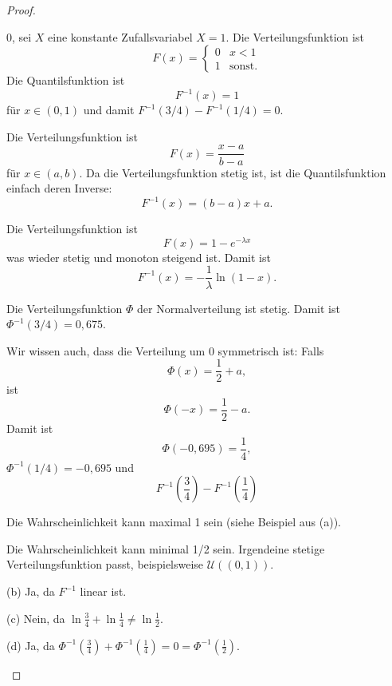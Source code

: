 	\begin{proof}
		\begin{parts}
			\item $0$, sei $X$ eine konstante Zufallsvariabel $X=1$. Die Verteilungsfunktion ist
			\[F(x)= \begin{cases}
				0 & x < 1\\
				1 & \text{sonst.}
			\end{cases}\]
			Die Quantilsfunktion ist
			\[F^{-1}(x) = 1\]
			f\"{u}r $x\in (0,1)$ und damit $F^{-1}(3/4) - F^{-1}(1/4)=0$.
			\item Die Verteilungsfunktion ist
			\[F(x) = \frac{x-a}{b-a}\]
			f\"{u}r $x\in (a,b)$. Da die Verteilungsfunktion stetig ist, ist die Quantilsfunktion einfach deren Inverse:
			\[F^{-1}(x)= (b-a)x +a.\]
			\item Die Verteilungsfunktion ist
			\[F(x)=1-e^{-\lambda x}\]
			was wieder stetig und monoton steigend ist. Damit ist
			\[F^{-1}(x) =-\frac{1}{\lambda}\ln (1-x).\]
			\item Die Verteilungsfunktion $\Phi$ der Normalverteilung ist stetig. Damit ist $\Phi^{-1}(3/4)=0,675$. 
			
			Wir wissen auch, dass die Verteilung um $0$ symmetrisch ist: Falls
			\[\Phi(x) = \frac 12 + a,\]
			ist
			\[\Phi(-x) = \frac 12 - a.\]
			Damit ist
			\[\Phi(-0,695)=\frac 14,\]
			$\Phi^{-1}(1/4)=-0,695$ und
			\[F^{-1}\left(\frac 34\right)-F^{-1}\left(\frac 14\right)\]
			\item Die Wahrscheinlichkeit kann maximal 1 sein (siehe Beispiel aus (a)).
			
			Die Wahrscheinlichkeit kann minimal 1/2 sein. Irgendeine stetige Verteilungsfunktion passt, beispielsweise $\mathcal{U}((0,1))$.
			\item  (b) Ja, da $F^{-1}$ linear ist.
			
			(c) Nein, da $\ln \frac 34 + \ln \frac 14\neq \ln \frac 12$.
			
			(d) Ja, da $\Phi^{-1}\left(\frac 34\right)+\Phi^{-1}\left(\frac 14\right)=0=\Phi^{-1}\left(\frac 12\right)$.\qedhere
		\end{parts}
	\end{proof}